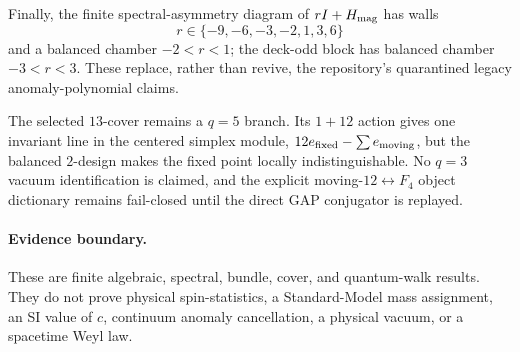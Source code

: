 Finally, the finite spectral-asymmetry diagram of $rI+H_{\rm mag}$ has walls
\[
 r\in\{-9,-6,-3,-2,1,3,6\}
\]
and a balanced chamber $-2<r<1$; the deck-odd block has balanced chamber
$-3<r<3$.  These replace, rather than revive, the repository's quarantined
legacy anomaly-polynomial claims.

The selected $13$-cover remains a $q=5$ branch.  Its $1+12$ action gives one
invariant line in the centered simplex module,
$12e_{\rm fixed}-\sum e_{\rm moving}$, but the balanced $2$-design makes the
fixed point locally indistinguishable.  No $q=3$ vacuum identification is
claimed, and the explicit moving-$12\leftrightarrow F_4$ object dictionary
remains fail-closed until the direct GAP conjugator is replayed.

\paragraph{Evidence boundary.}
These are finite algebraic, spectral, bundle, cover, and quantum-walk results.
They do not prove physical spin-statistics, a Standard-Model mass assignment,
an SI value of $c$, continuum anomaly cancellation, a physical vacuum, or a
spacetime Weyl law.
